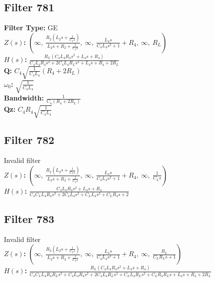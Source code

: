 \documentclass{article}
\begin{document}
\subsection*{Filter 781}
\textbf{Filter Type:} GE \\ 
\textbf{$Z(s)$:} $\left( \infty, \  \frac{R_{2} \left(L_{2} s + \frac{1}{C_{2} s}\right)}{L_{2} s + R_{2} + \frac{1}{C_{2} s}}, \  \infty, \  \frac{L_{4} s}{C_{4} L_{4} s^{2} + 1} + R_{4}, \  \infty, \  R_{L}\right)$ \\ 
\textbf{$H(s)$:} $\frac{R_{L} \left(C_{4} L_{4} R_{4} s^{2} + L_{4} s + R_{4}\right)}{C_{4} L_{4} R_{4} s^{2} + 2 C_{4} L_{4} R_{L} s^{2} + L_{4} s + R_{4} + 2 R_{L}}$ \\ 
\textbf{Q:} $C_{4} \sqrt{\frac{1}{C_{4} L_{4}}} \left(R_{4} + 2 R_{L}\right)$ \\ 
\textbf{$\omega_0$:} $\sqrt{\frac{1}{C_{4} L_{4}}}$ \\ 
\textbf{Bandwidth:} $\frac{1}{C_{4} \left(R_{4} + 2 R_{L}\right)}$ \\ 
\textbf{Qz:} $C_{4} R_{4} \sqrt{\frac{1}{C_{4} L_{4}}}$ \\ 
\subsection*{Filter 782}
Invalid filter \\ 
\textbf{$Z(s)$:} $\left( \infty, \  \frac{R_{2} \left(L_{2} s + \frac{1}{C_{2} s}\right)}{L_{2} s + R_{2} + \frac{1}{C_{2} s}}, \  \infty, \  \frac{L_{4} s}{C_{4} L_{4} s^{2} + 1} + R_{4}, \  \infty, \  \frac{1}{C_{L} s}\right)$ \\ 
\textbf{$H(s)$:} $\frac{C_{4} L_{4} R_{4} s^{2} + L_{4} s + R_{4}}{C_{4} C_{L} L_{4} R_{4} s^{3} + 2 C_{4} L_{4} s^{2} + C_{L} L_{4} s^{2} + C_{L} R_{4} s + 2}$ \\ 
\subsection*{Filter 783}
Invalid filter \\ 
\textbf{$Z(s)$:} $\left( \infty, \  \frac{R_{2} \left(L_{2} s + \frac{1}{C_{2} s}\right)}{L_{2} s + R_{2} + \frac{1}{C_{2} s}}, \  \infty, \  \frac{L_{4} s}{C_{4} L_{4} s^{2} + 1} + R_{4}, \  \infty, \  \frac{R_{L}}{C_{L} R_{L} s + 1}\right)$ \\ 
\textbf{$H(s)$:} $\frac{R_{L} \left(C_{4} L_{4} R_{4} s^{2} + L_{4} s + R_{4}\right)}{C_{4} C_{L} L_{4} R_{4} R_{L} s^{3} + C_{4} L_{4} R_{4} s^{2} + 2 C_{4} L_{4} R_{L} s^{2} + C_{L} L_{4} R_{L} s^{2} + C_{L} R_{4} R_{L} s + L_{4} s + R_{4} + 2 R_{L}}$ \\ 
\end{document}
